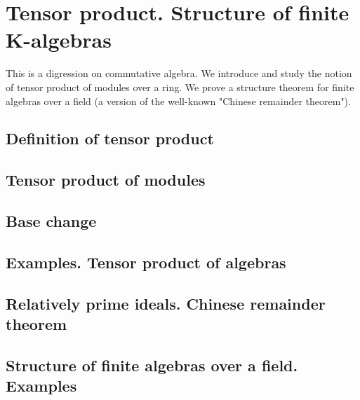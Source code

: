 \chapter{Tensor product. Structure of finite K-algebras}
This is a digression on commutative algebra. We introduce and study
the notion of tensor product of modules over a ring. We prove a
structure theorem for finite algebras over a field (a version of the
well-known "Chinese remainder theorem").


\section{Definition of tensor product}
\section{Tensor product of modules}
\section{Base change}
\section{Examples. Tensor product of algebras}
\section{Relatively prime ideals. Chinese remainder theorem}
\section{Structure of finite algebras over a field. Examples}
